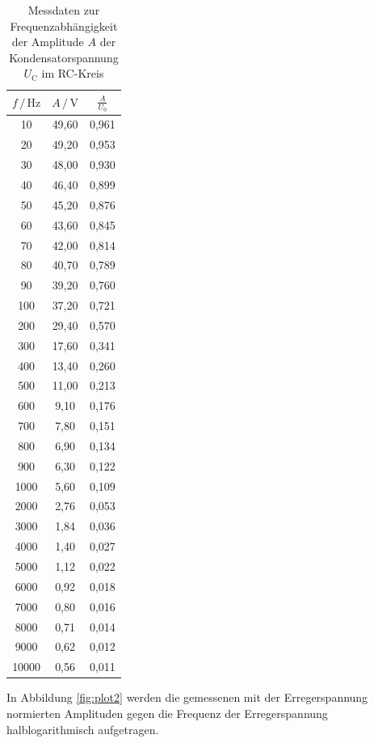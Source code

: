\begin{table}
\centering
\caption{Messdaten zur Frequenzabhängigkeit der Amplitude $A$ der Kondensatorspannung $U_\text{C}$ im RC-Kreis}
\label{tab:Messdaten2}
\begin{tabular}{c c c}
\toprule
$f \,/\, \si{\hertz}$ & $A \,/\, \si{\volt}$ & $\frac{A}{U_0}$ \\
\midrule
   10 & 49,60 & 0,961\\
   20 & 49,20 & 0,953\\
   30 & 48,00 & 0,930\\
   40 & 46,40 & 0,899\\
   50 & 45,20 & 0,876\\
   60 & 43,60 & 0,845\\
   70 & 42,00 & 0,814\\
   80 & 40,70 & 0,789\\
   90 & 39,20 & 0,760\\
  100 & 37,20 & 0,721\\
  200 & 29,40 & 0,570\\
  300 & 17,60 & 0,341\\
  400 & 13,40 & 0,260\\
  500 & 11,00 & 0,213\\
  600 &  9,10 & 0,176\\
  700 &  7,80 & 0,151\\
  800 &  6,90 & 0,134\\
  900 &  6,30 & 0,122\\
 1000 &  5,60 & 0,109\\
 2000 &  2,76 & 0,053\\
 3000 &  1,84 & 0,036\\
 4000 &  1,40 & 0,027\\
 5000 &  1,12 & 0,022\\
 6000 &  0,92 & 0,018\\
 7000 &  0,80 & 0,016\\
 8000 &  0,71 & 0,014\\
 9000 &  0,62 & 0,012\\
10000 &  0,56 & 0,011\\
\bottomrule
\end{tabular}
\end{table} 

In Abbildung \ref{fig:plot2} werden die gemessenen mit der Erregerspannung normierten
Amplituden gegen die Frequenz der Erregerspannung halblogarithmisch
aufgetragen. 

